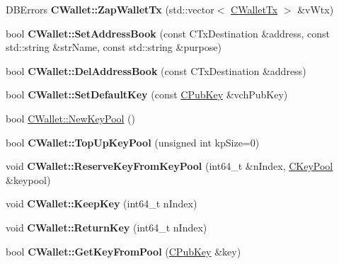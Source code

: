 \begin{DoxyCompactItemize}
\mbox{\label{group___actions_ga71d4b810d6fce19efd455ded3e450a1b}} 
D\+B\+Errors {\bfseries C\+Wallet\+::\+Zap\+Wallet\+Tx} (std\+::vector$<$ \mbox{\hyperlink{class_c_wallet_tx}{C\+Wallet\+Tx}} $>$ \&v\+Wtx)
\item 
\mbox{\label{group___actions_ga53e5528d7005608594e73f500bc5bb8f}} 
bool {\bfseries C\+Wallet\+::\+Set\+Address\+Book} (const C\+Tx\+Destination \&address, const std\+::string \&str\+Name, const std\+::string \&purpose)
\item 
\mbox{\label{group___actions_gac6542da8493cbb958068b7a01c05b631}} 
bool {\bfseries C\+Wallet\+::\+Del\+Address\+Book} (const C\+Tx\+Destination \&address)
\item 
\mbox{\label{group___actions_gad54cca8f6e5e1d5535860f43ddb0246f}} 
bool {\bfseries C\+Wallet\+::\+Set\+Default\+Key} (const \mbox{\hyperlink{class_c_pub_key}{C\+Pub\+Key}} \&vch\+Pub\+Key)
\item 
bool \mbox{\hyperlink{group___actions_ga7353ba1e79fc4167fbfbe79b41698fa7}{C\+Wallet\+::\+New\+Key\+Pool}} ()
\item 
\mbox{\label{group___actions_ga9730278506e0a4f1c65239b951525b55}} 
bool {\bfseries C\+Wallet\+::\+Top\+Up\+Key\+Pool} (unsigned int kp\+Size=0)
\item 
\mbox{\label{group___actions_ga9921854840668a1856998f041177dd2b}} 
void {\bfseries C\+Wallet\+::\+Reserve\+Key\+From\+Key\+Pool} (int64\+\_\+t \&n\+Index, \mbox{\hyperlink{class_c_key_pool}{C\+Key\+Pool}} \&keypool)
\item 
\mbox{\label{group___actions_gae460b8c824a1a6633615f95373e533f2}} 
void {\bfseries C\+Wallet\+::\+Keep\+Key} (int64\+\_\+t n\+Index)
\item 
\mbox{\label{group___actions_ga4ee5566c2b4c8f4ed5cec628573b9275}} 
void {\bfseries C\+Wallet\+::\+Return\+Key} (int64\+\_\+t n\+Index)
\item 
\mbox{\label{group___actions_ga18549ec5c472c003afc4794daeb9adfd}} 
bool {\bfseries C\+Wallet\+::\+Get\+Key\+From\+Pool} (\mbox{\hyperlink{class_c_pub_key}{C\+Pub\+Key}} \&key)

\end{DoxyCompactItemize}
